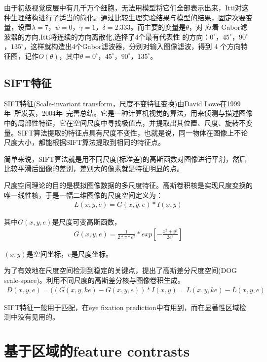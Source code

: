 \documentclass[12pt]{article}
\begin{document}
由于初级视觉皮层中有几千万个细胞，无法用模型将它们全部表示出来，Itti对这种生理结构进行了适当的简化。通过比较生理实验结果与模型的结果，固定次要变量，设置$ \lambda = 7$，$\psi= 0$，$\gamma = 1$，$\delta = 2.333$。而主要的变量是$\theta$，对 应着 Gabor滤波器的方向,Itti将连续的方向离散化,选择了4个最有代表性 的方向：$0^{\circ}$，$45^{\circ}$，$90^{\circ}$，$135^{\circ}$，这样就构造出4个Gabor滤波器，分别对输入图像滤波，得到 4 个方向特征图，记作$O(\theta)$，其中$\theta=0^{\circ}$，$45^{\circ}$，$90^{\circ}$，$135^{\circ}$。

\subsection{SIFT特征}

SIFT特征(Scale-invariant transform，尺度不变特征变换)由David Lowe在1999年~\cite{lowe1999object}所发表，2004年~\cite{lowe2004distinctive}完善总结。它是一种计算机视觉的算法，用来侦测与描述图像中的局部性特征，它在空间尺度中寻找极值点，并提取出其位置、尺度、旋转不变量。SIFT算法提取的特征点具有尺度不变性，也就是说，同一物体在图像上不论尺度大小，都能根据SIFT算法提取到相同的特征点。

简单来说，SIFT算法就是用不同尺度(标准差)的高斯函数对图像进行平滑，然后比较平滑后图像的差别，差别大的像素就是特征明显的点。

尺度空间理论的目的是模拟图像数据的多尺度特征。高斯卷积核是实现尺度变换的唯一线性核，于是一幅二维图像的尺度空间定义为：
\begin{align}
L(x, y, e) = G(x, y, e) * I(x, y)
\end{align}

其中$G(x, y, e)$是尺度可变高斯函数，
\begin{align}
 G(x,y,e) = \frac{1}{2*\pi *e^2} * exp[-\frac{x^2 + y^2}{2e^2}]
\end{align}

$(x, y)$是空间坐标，$e$是尺度坐标。

为了有效地在尺度空间检测到稳定的关键点，提出了高斯差分尺度空间(DOG scale-space)。利用不同尺度的高斯差分核与图像卷积生成。
\begin{align}
D(x,y,e) = ((G(x,y,ke) - G(x,y,e)) * I(x,y) = L(x,y,ke) - L(x,y,e)
\end{align}

SIFT特征一般用于匹配，在eye fixation prediction中有用到，而在显著性区域检测中没有见用的。

\section{基于区域的feature contrasts}
\end{document}

